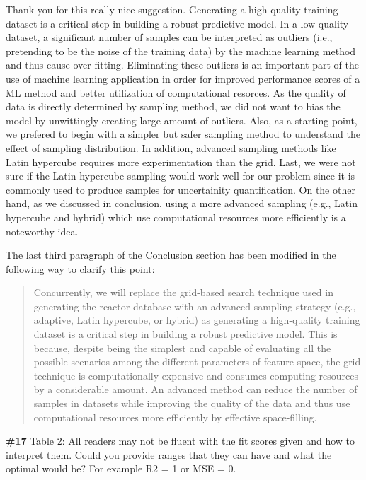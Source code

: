 \documentclass{ar2rc}
\begin{document}
    \Response Thank you for this really nice suggestion. Generating a high-quality training dataset is a critical step in building a robust predictive model. In a low-quality dataset, a significant number of samples can be interpreted as outliers (i.e., pretending to be the noise of the training data) by the machine learning method and thus cause over-fitting. Eliminating these outliers is an important part of the use of machine learning application in order for improved performance scores of a ML method and better utilization of computational resorces. As the quality of data is directly determined by sampling method, we did not want to bias the model by unwittingly creating large amount of outliers. Also, as a starting point, we prefered to begin with a simpler but safer sampling method to understand the effect of sampling distribution. In addition, advanced sampling methods like Latin hypercube requires more experimentation than the grid. Last, we were not sure if the Latin hypercube sampling would work well for our problem since it is commonly used to produce samples for uncertainity quantification. On the other hand, as we discussed in conclusion, using a more advanced sampling (e.g., Latin hypercube and hybrid) which use computational resources more efficiently is a noteworthy idea.

    The last third paragraph of the Conclusion section has been modified in the following way to clarify this point:\\

    \begin{quote}
        Concurrently, we will replace the grid-based search technique used in generating the reactor database with an advanced sampling strategy (e.g., adaptive, Latin hypercube, or hybrid) as generating a high-quality training dataset is a critical step in building a robust predictive model. This is because, despite being the simplest and capable of evaluating all the possible scenarios among the different parameters of feature space, the grid technique is computationally expensive and consumes computing resources by a considerable amount. An advanced method can reduce the number of samples in datasets while improving the quality of the data and thus use computational resources more efficiently by effective space-filling.
    \end{quote}


    \Comment \textbf{\#17} Table 2: All readers may not be fluent with the fit scores given
    and how to interpret them. Could you provide ranges that they can have and
    what the optimal would be? For example R2 = 1 or MSE = 0.
\end{document}
